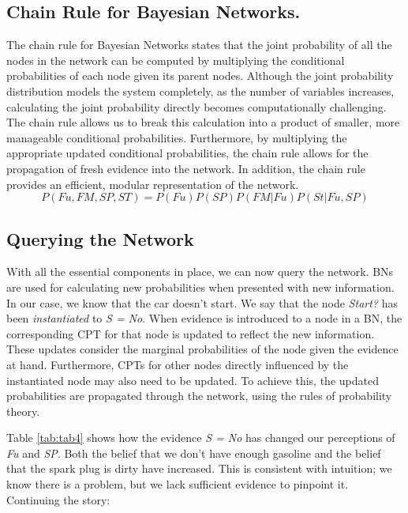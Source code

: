 \documentclass[twocol]{ametsoc}
\begin{document}
\hypertarget{chain-rule-for-bayesian-networks.}{%
\subsection{Chain Rule for Bayesian
Networks.}\label{chain-rule-for-bayesian-networks.}}

The chain rule for Bayesian Networks states that the joint probability
of all the nodes in the network can be computed by multiplying the
conditional probabilities of each node given its parent nodes. Although
the joint probability distribution models the system completely, as the
number of variables increases, calculating the joint probability
directly becomes computationally challenging. The chain rule allows us
to break this calculation into a product of smaller, more manageable
conditional probabilities. Furthermore, by multiplying the appropriate
updated conditional probabilities, the chain rule allows for the
propagation of fresh evidence into the network. In addition, the chain
rule provides an efficient, modular representation of the network. \[
P(Fu, FM, SP, ST) = P(Fu)P(SP)P(FM|Fu)P(St|Fu, SP)
\]

\hypertarget{querying-the-network}{%
\subsection{Querying the Network}\label{querying-the-network}}

With all the essential components in place, we can now query the
network. BNs are used for calculating new probabilities when presented
with new information. In our case, we know that the car doesn't start.
We say that the node \emph{Start?} has been \emph{instantiated} to
\emph{S = No}. When evidence is introduced to a node in a BN, the
corresponding CPT for that node is updated to reflect the new
information. These updates consider the marginal probabilities of the
node given the evidence at hand. Furthermore, CPTs for other nodes
directly influenced by the instantiated node may also need to be
updated. To achieve this, the updated probabilities are propagated
through the network, using the rules of probability theory.

Table \ref{tab:tab4} shows how the evidence \emph{S = No} has changed
our perceptions of \emph{Fu} and \emph{SP}. Both the belief that we
don't have enough gasoline and the belief that the spark plug is dirty
have increased. This is consistent with intuition; we know there is a
problem, but we lack sufficient evidence to pinpoint it. Continuing the
story:
\end{document}
